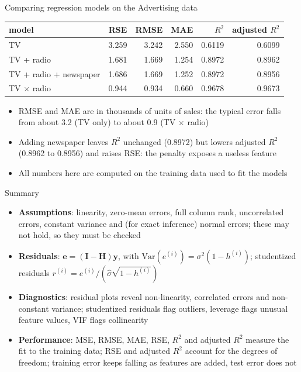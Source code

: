 \begin{frame}{Comparing regression models on the Advertising data}
    \begin{center}
        \small
        \begin{tabular}{lrrrrr}
            \toprule
            model & RSE & RMSE & MAE & $R^2$ & adjusted $R^2$ \\
            \midrule
            TV & 3.259 & 3.242 & 2.550 & 0.6119 & 0.6099 \\
            TV + radio & 1.681 & 1.669 & 1.254 & 0.8972 & 0.8962 \\
            TV + radio + newspaper & 1.686 & 1.669 & 1.252 & 0.8972 & 0.8956 \\
            TV $\times$ radio & 0.944 & 0.934 & 0.660 & 0.9678 & 0.9673 \\
            \bottomrule
        \end{tabular}
    \end{center}
    \begin{itemize}
        \item RMSE and MAE are in thousands of units of sales: the typical error falls from about 3.2 (TV only) to about 0.9 (TV $\times$ radio)
        \item Adding newspaper leaves $R^2$ unchanged (0.8972) but lowers adjusted $R^2$ (0.8962 to 0.8956) and raises RSE: the penalty exposes a useless feature
        \item All numbers here are computed on the training data used to fit the models
    \end{itemize}
\end{frame}


\begin{frame}{Summary}
    \begin{itemize}
        \item \textbf{Assumptions}: linearity, zero-mean errors, full column rank, uncorrelated errors, constant variance and (for exact inference) normal errors; these may not hold, so they must be checked
        \item \textbf{Residuals}: $\mathbf{e} = (\mathbf{I} - \mathbf{H})\mathbf{y}$, with $\mathrm{Var}(e^{(i)}) = \sigma^2 (1 - h^{(i)})$; studentized residuals $r^{(i)} = e^{(i)}/(\hat\sigma\sqrt{1-h^{(i)}})$
        \item \textbf{Diagnostics}: residual plots reveal non-linearity, correlated errors and non-constant variance; studentized residuals flag outliers, leverage flags unusual feature values, VIF flags collinearity
        \item \textbf{Performance}: MSE, RMSE, MAE, RSE, $R^2$ and adjusted $R^2$ measure the fit to the training data; RSE and adjusted $R^2$ account for the degrees of freedom; training error keeps falling as features are added, test error does not
    \end{itemize}
\end{frame}
